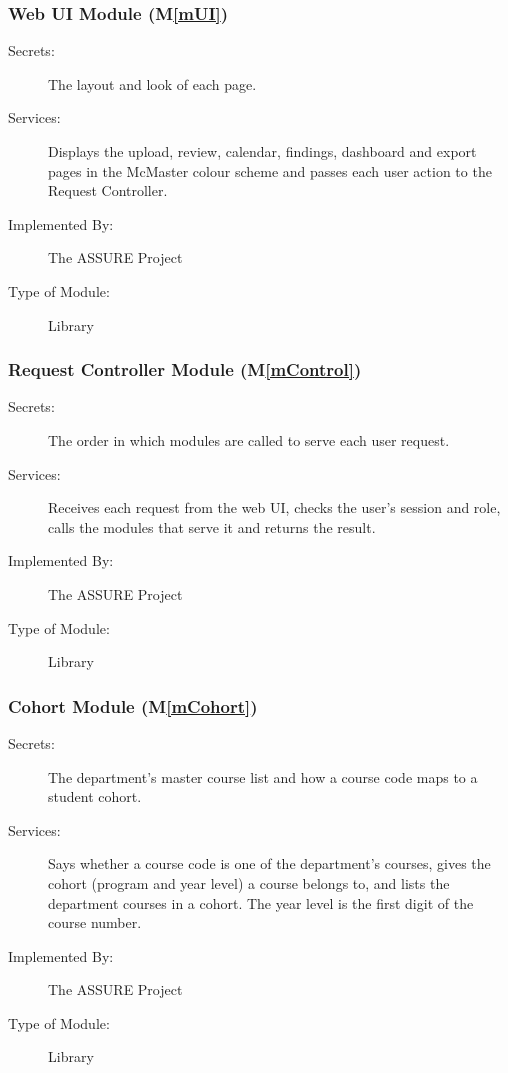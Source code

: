 \documentclass[12pt, titlepage]{article}
\newcommand{\sysname}{The ASSURE Project}
\newcommand{\mref}[1]{M\ref{#1}}
\begin{document}
\subsubsection{Web UI Module (\mref{mUI})}

\begin{description}
\item[Secrets:] The layout and look of each page.
\item[Services:] Displays the upload, review, calendar, findings, dashboard
  and export pages in the McMaster colour scheme and passes each user action to
  the Request Controller.
\item[Implemented By:] \sysname
\item[Type of Module:] Library
\end{description}

\subsubsection{Request Controller Module (\mref{mControl})} \label{SecMD-mControl}

\begin{description}
\item[Secrets:] The order in which modules are called to serve each user
  request.
\item[Services:] Receives each request from the web UI, checks the user's
  session and role, calls the modules that serve it and returns the result.
\item[Implemented By:] \sysname
\item[Type of Module:] Library
\end{description}

\subsubsection{Cohort Module (\mref{mCohort})} \label{SecMD-mCohort}

\begin{description}
\item[Secrets:] The department's master course list and how a course code
  maps to a student cohort.
\item[Services:] Says whether a course code is one of the department's
  courses, gives the cohort (program and year level) a course belongs to, and
  lists the department courses in a cohort. The year level is the first digit
  of the course number.
\item[Implemented By:] \sysname
\item[Type of Module:] Library
\end{description}
\end{document}
